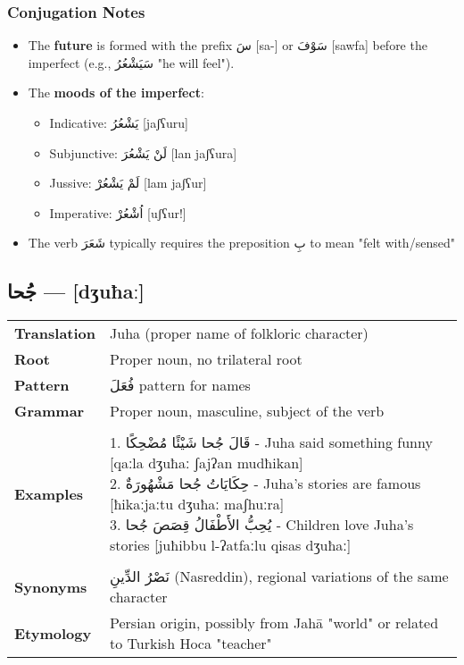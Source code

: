 \documentclass[letter,12pt]{article}
\begin{document}
\subsubsection*{Conjugation Notes}
\begin{itemize}
  \item The \textbf{future} is formed with the prefix \textarabic{سَ} [sa-] or \textarabic{سَوْفَ} [sawfa] before the imperfect (e.g., \textarabic{سَيَشْعُرُ} "he will feel").
  \item The \textbf{moods of the imperfect}:
    \begin{itemize}
      \item Indicative: \textarabic{يَشْعُرُ} [jaʃʕuru]
      \item Subjunctive: \textarabic{لَنْ يَشْعُرَ} [lan jaʃʕura]
      \item Jussive: \textarabic{لَمْ يَشْعُرْ} [lam jaʃʕur]
      \item Imperative: \textarabic{اُشْعُرْ} [uʃʕur!]
    \end{itemize}
  \item The verb \textarabic{شَعَرَ} typically requires the preposition \textarabic{بِ} to mean "felt with/sensed"
\end{itemize}

\subsection{\textarabic{جُحا} — [dʒuħaː]}
\begin{tabular}{p{3cm}p{10cm}}
\toprule
\textbf{Translation} & Juha (proper name of folkloric character) \\
\textbf{Root} & Proper noun, no trilateral root \\
\textbf{Pattern} & \textarabic{فُعَلَ} pattern for names \\
\textbf{Grammar} & Proper noun, masculine, subject of the verb \\
\midrule \\
\textbf{Examples} & \makecell[l]{\parbox{9.5cm}{
1. \textarabic{قَالَ جُحا شَيْئًا مُضْحِكًا} - Juha said something funny [qaːla dʒuħaː ʃajʔan mudħikan]\\
2. \textarabic{حِكَايَاتُ جُحا مَشْهُورَةٌ} - Juha's stories are famous [ħikaːjaːtu dʒuħaː maʃhuːra]\\
3. \textarabic{يُحِبُّ الأَطْفَالُ قِصَصَ جُحا} - Children love Juha's stories [juħibbu l-ʔatfaːlu qisas dʒuħaː]
}} \\
\midrule \\
\textbf{Synonyms} & \textarabic{نَصْرُ الدِّينِ} (Nasreddin), regional variations of the same character \\
\textbf{Etymology} & Persian origin, possibly from Jahā "world" or related to Turkish Hoca "teacher" \\
\bottomrule
\end{tabular}
\end{document}
